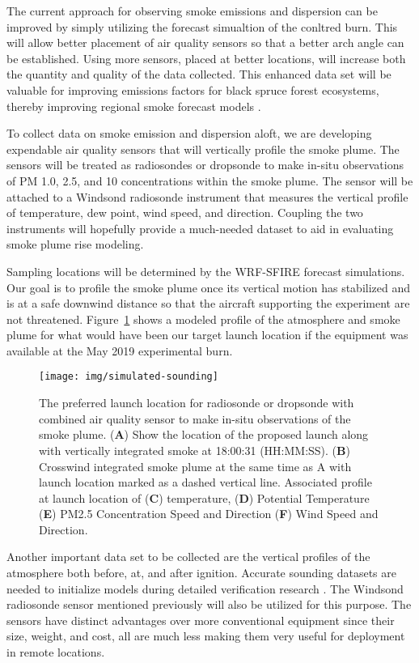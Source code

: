 \documentclass[preprints,article,accept,moreauthors,pdftex]{Definitions/mdpi}
\begin{document}
The current approach for observing smoke emissions and dispersion can be improved by simply utilizing the forecast simualtion of the conltred burn. This will allow better placement of air quality sensors so that a better arch angle can be established. Using more sensors, placed at better locations, will increase both the quantity and quality of the data collected. This enhanced data set will be valuable for improving emissions factors for black spruce forest ecosystems, thereby improving regional smoke forecast models \cite{prichard_wildland_2020}.

To collect data on smoke emission and dispersion aloft, we are developing expendable air quality sensors that will vertically profile the smoke plume. The sensors will be treated as radiosondes or dropsonde to make in-situ observations of PM 1.0, 2.5, and 10 concentrations within the smoke plume. The sensor will be attached to a Windsond radiosonde instrument \cite{bessardon_evaluation_2019} that measures the vertical profile of temperature, dew point, wind speed, and direction. Coupling the two instruments will hopefully provide a much-needed dataset to aid in evaluating smoke plume rise modeling.

Sampling locations will be determined by the WRF-SFIRE forecast simulations. Our goal is to profile the smoke plume once its vertical motion has stabilized and is at a safe downwind distance so that the aircraft supporting the experiment are not threatened. Figure~\ref{fig8} shows a modeled profile of the atmosphere and smoke plume for what would have been our target launch location if the equipment was available at the May 2019 experimental burn.

\begin{figure}[H]
\centering
 \texttt{[image: img/simulated-sounding]}
 \caption{The preferred launch location for radiosonde or dropsonde with combined air quality sensor to make in-situ observations of the smoke plume. (\textbf{A}) Show the location of the proposed launch along with vertically integrated smoke at 18:00:31 (HH:MM:SS). (\textbf{B}) Crosswind integrated smoke plume at the same time as A with launch location marked as a dashed vertical line. Associated profile at launch location of (\textbf{C}) temperature, (\textbf{D}) Potential Temperature (\textbf{E}) PM2.5 Concentration Speed and Direction (\textbf{F}) Wind Speed and Direction. \label{fig8}}
 \end{figure}

Another important data set to be collected are the vertical profiles of the atmosphere both before, at, and after ignition. Accurate sounding datasets are needed to initialize models during detailed verification research \cite{kochanski_experimental_2018,moisseeva_capturing_2019}. The Windsond radiosonde sensor mentioned previously will also be utilized for this purpose. The sensors have distinct advantages over more conventional equipment since their size, weight, and cost, all are much less making them very useful for deployment in remote locations.
\end{document}
